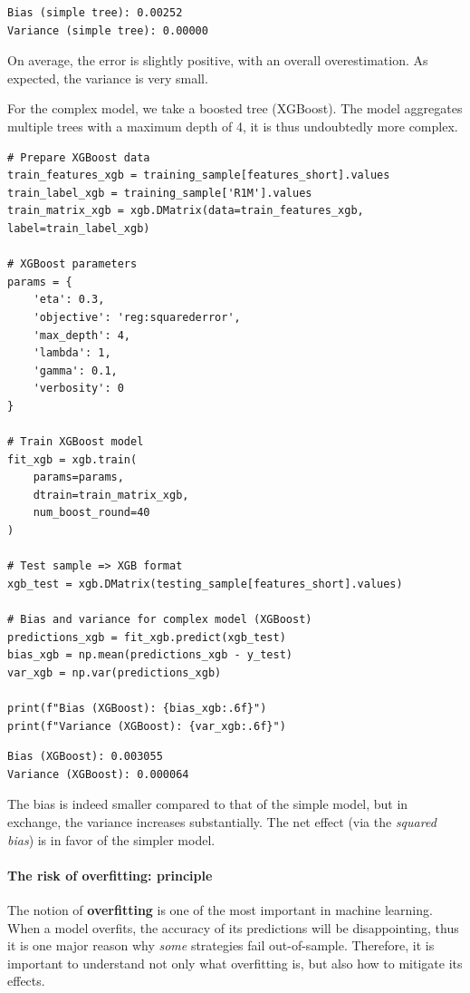 \begin{verbatim}
Bias (simple tree): 0.00252
Variance (simple tree): 0.00000
\end{verbatim}

On average, the error is slightly positive, with an overall overestimation. As expected, the variance is very small.

For the complex model, we take a boosted tree (XGBoost). The model aggregates multiple trees with a maximum depth of 4, it is thus undoubtedly more complex.

\begin{verbatim}
# Prepare XGBoost data
train_features_xgb = training_sample[features_short].values
train_label_xgb = training_sample['R1M'].values
train_matrix_xgb = xgb.DMatrix(data=train_features_xgb, label=train_label_xgb)

# XGBoost parameters
params = {
    'eta': 0.3,
    'objective': 'reg:squarederror',
    'max_depth': 4,
    'lambda': 1,
    'gamma': 0.1,
    'verbosity': 0
}

# Train XGBoost model
fit_xgb = xgb.train(
    params=params,
    dtrain=train_matrix_xgb,
    num_boost_round=40
)

# Test sample => XGB format
xgb_test = xgb.DMatrix(testing_sample[features_short].values)

# Bias and variance for complex model (XGBoost)
predictions_xgb = fit_xgb.predict(xgb_test)
bias_xgb = np.mean(predictions_xgb - y_test)
var_xgb = np.var(predictions_xgb)

print(f"Bias (XGBoost): {bias_xgb:.6f}")
print(f"Variance (XGBoost): {var_xgb:.6f}")
\end{verbatim}

\begin{verbatim}
Bias (XGBoost): 0.003055
Variance (XGBoost): 0.000064
\end{verbatim}

The bias is indeed smaller compared to that of the simple model, but in exchange, the variance increases substantially. The net effect (via the \textit{squared bias}) is in favor of the simpler model.

\paragraph{The risk of overfitting: principle}

The notion of \textbf{overfitting} is one of the most important in machine learning. When a model overfits, the accuracy of its predictions will be disappointing, thus it is one major reason why \textit{some} strategies fail out-of-sample. Therefore, it is important to understand not only what overfitting is, but also how to mitigate its effects.

